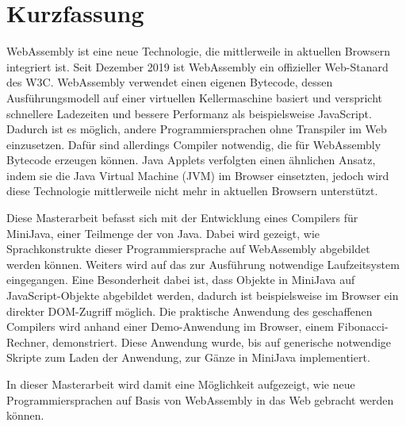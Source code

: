 \chapter{Kurzfassung}

WebAssembly ist eine neue Technologie, die mittlerweile in aktuellen Browsern integriert ist. Seit Dezember 2019 ist WebAssembly ein offizieller Web-Stanard des W3C. WebAssembly verwendet einen eigenen Bytecode, dessen Ausführungsmodell auf einer virtuellen Kellermaschine basiert und verspricht schnellere Ladezeiten und bessere Performanz als beispielsweise JavaScript. Dadurch ist es möglich, andere Programmiersprachen ohne Transpiler im Web einzusetzen. Dafür sind allerdings Compiler notwendig, die für WebAssembly Bytecode erzeugen können. Java Applets verfolgten einen ähnlichen Ansatz, indem sie die Java Virtual Machine (JVM) im Browser einsetzten, jedoch wird diese Technologie mittlerweile nicht mehr in aktuellen Browsern unterstützt.

Diese Masterarbeit befasst sich mit der Entwicklung eines Compilers für MiniJava, einer Teilmenge der von Java. Dabei wird gezeigt, wie Sprachkonstrukte dieser Programmiersprache auf WebAssembly abgebildet werden können. Weiters wird auf das zur Ausführung notwendige Laufzeitsystem eingegangen. Eine Besonderheit dabei ist, dass Objekte in MiniJava auf JavaScript-Objekte abgebildet werden, dadurch ist beispielsweise im Browser ein direkter DOM-Zugriff möglich. Die praktische Anwendung des geschaffenen Compilers wird anhand einer Demo-Anwendung im Browser, einem Fibonacci-Rechner, demonstriert. Diese Anwendung wurde, bis auf generische notwendige Skripte zum Laden der Anwendung, zur Gänze in MiniJava implementiert.

In dieser Masterarbeit wird damit eine Möglichkeit aufgezeigt, wie neue Programmiersprachen auf Basis von WebAssembly in das Web gebracht werden können.
